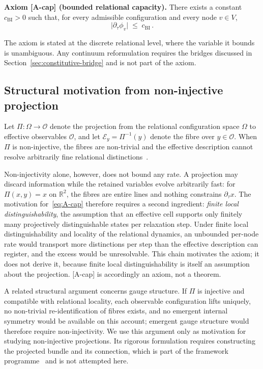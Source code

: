\documentclass[epj]{svjour}
\begin{document}
      \medskip
      \noindent\textbf{Axiom [A-cap] (bounded relational capacity).}
      There exists a constant $c_{\mathrm{BI}} > 0$ such that, for every admissible configuration and
      every node $v \in V$,
      \begin{equation}
        \bigl|\partial_\tau \phi_v\bigr| \;\le\; c_{\mathrm{BI}}\,.
        \label{eq:A-cap}
      \end{equation}
      \medskip

      The axiom is stated at the discrete relational level, where the variable it bounds is
      unambiguous.
      Any continuum reformulation requires the bridges discussed in
      Section~\ref{sec:constitutive-bridge} and is not part of the axiom.

    \subsection{Structural motivation from non-injective projection}
      \label{subsec:motivation}

      Let $\Pi : \Omega \to \mathcal{O}$ denote the projection from the relational configuration
      space $\Omega$ to effective observables $\mathcal{O}$, and let
      $\mathcal{E}_y = \Pi^{-1}(y)$ denote the fibre over $y \in \mathcal{O}$.
      When $\Pi$ is non-injective, the fibres are non-trivial and the effective description cannot
      resolve arbitrarily fine relational distinctions~\cite{Beau2026b}.

      Non-injectivity alone, however, does not bound any rate.
      A projection may discard information while the retained variables evolve arbitrarily fast:
      for $\Pi(x, y) = x$ on $\mathbb{R}^2$, the fibres are entire lines and nothing constrains
      $\partial_\tau x$.
      The motivation for~\eqref{eq:A-cap} therefore requires a second ingredient: \emph{finite local
      distinguishability}, the assumption that an effective cell supports only finitely many
      projectively distinguishable states per relaxation step.
      Under finite local distinguishability and locality of the relational dynamics, an unbounded
      per-node rate would transport more distinctions per step than the effective description can
      register, and the excess would be unresolvable.
      This chain motivates the axiom; it does not derive it, because finite local distinguishability
      is itself an assumption about the projection.
      [A-cap] is accordingly an axiom, not a theorem.

      A related structural argument concerns gauge structure.
      If $\Pi$ is injective and compatible with relational locality, each observable configuration
      lifts uniquely, no non-trivial re-identification of fibres exists, and no emergent internal
      symmetry would be available on this account; emergent gauge structure would therefore require
      non-injectivity.
      We use this argument only as motivation for studying non-injective projections.
      Its rigorous formulation requires constructing the projected bundle and its connection, which
      is part of the framework programme~\cite{Beau2026whitepaper} and is not attempted here.
\end{document}
